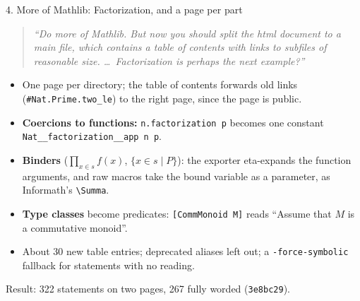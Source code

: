 \documentclass[10pt,aspectratio=169]{beamer}
\newcommand{\commit}[1]{\texttt{\footnotesize #1}}
\newcommand{\prompt}[1]{\begin{quote}\small\itshape ``#1''\end{quote}}
\begin{document}
\begin{frame}{4. More of Mathlib: Factorization, and a page per part}
  \small
  \prompt{Do more of Mathlib. But now you should split the html document to a
  main file, which contains a table of contents with links to subfiles of
  reasonable size. \ldots\ Factorization is perhaps the next example?}
  \begin{itemize}
    \item One page per directory; the table of contents forwards old links
          (\texttt{\#Nat.Prime.two\_le}) to the right page, since the page is public.
    \item \textbf{Coercions to functions:} \texttt{n.factorization p} becomes one
          constant \texttt{Nat\_\_factorization\_\_app n p}.
    \item \textbf{Binders} ($\prod_{x \in s} f(x)$, $\{x \in s \mid P\}$): the
          exporter eta-expands the function arguments, and raw macros take the
          bound variable as a parameter, as Informath's \texttt{\textbackslash Summa}.
    \item \textbf{Type classes} become predicates: \texttt{[CommMonoid M]} reads
          ``Assume that $M$ is a commutative monoid''.
    \item About 30 new table entries; deprecated aliases left out; a
          \texttt{-force-symbolic} fallback for statements with no reading.
  \end{itemize}
  Result: 322 statements on two pages, 267 fully worded (\commit{3e8bc29}).
\end{frame}
\end{document}
